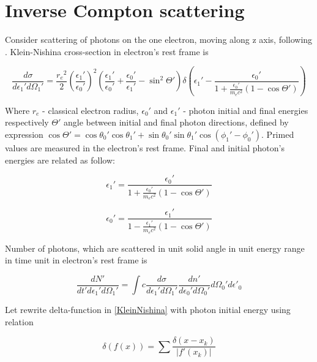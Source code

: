 \section{Inverse Compton scattering}\label{ComptonFormulaeSection}

Consider scattering of photons on the one electron, moving along z axis, following \cite{Dubus}. Klein-Nishina cross-section in electron's rest frame is

\begin{equation}\label{KleinNishina}
	\frac{d\sigma}{d\epsilon_1'd\Omega_1'}=\frac{{r_e}^2}{2}\left(\frac{\epsilon_1'}{\epsilon_0'}\right)^2\left(\frac{\epsilon_1'}{\epsilon_0'}+\frac{\epsilon_0'}{\epsilon_1'}-\sin^2\Theta'\right) \delta\left(\epsilon_1' - \frac{\epsilon_0'}{1+\frac{\epsilon_0'}{m_e c^2}(1 - \cos \Theta')}\right)
\end{equation}

Where $r_e$ - classical electron radius, $\epsilon_0'$ and $\epsilon_1'$ - photon initial and final energies respectively $\Theta'$ angle between initial and final photon directions, defined by expression $\cos\Theta' =\cos \theta_0' \cos \theta_1' + \sin \theta_0' \sin \theta_1' \cos(\phi_1' - \phi_0')$. Primed values are measured in the electron's rest frame. Final and initial photon's energies are related as follow:

\begin{equation}
	\epsilon_1'=\frac{\epsilon_0'}{1+\frac{\epsilon_0'}{m_e c^2}(1 - \cos \Theta')}	
\end{equation}

\begin{equation}
	\epsilon_0'=\frac{\epsilon_1'}{1-\frac{\epsilon_1'}{m_e c^2}(1 - \cos \Theta')}
\end{equation}

Number of photons, which are scattered in unit solid angle in unit energy range in time unit in electron's rest frame is 

\begin{equation}
\frac{dN'}{dt'd\epsilon_1'd\Omega_1'}=\int c \frac{d\sigma}{d\epsilon_1'd\Omega_1'} \frac{dn'}{d\epsilon_0'd\Omega_0'}d\Omega_0'd\epsilon'_0
\end{equation}

Let rewrite delta-function in \ref{KleinNishina} with photon initial energy using relation

\begin{equation}
	\delta(f(x)) = \sum \frac{\delta(x-x_k)}{|f'(x_k)|}
\end{equation}

